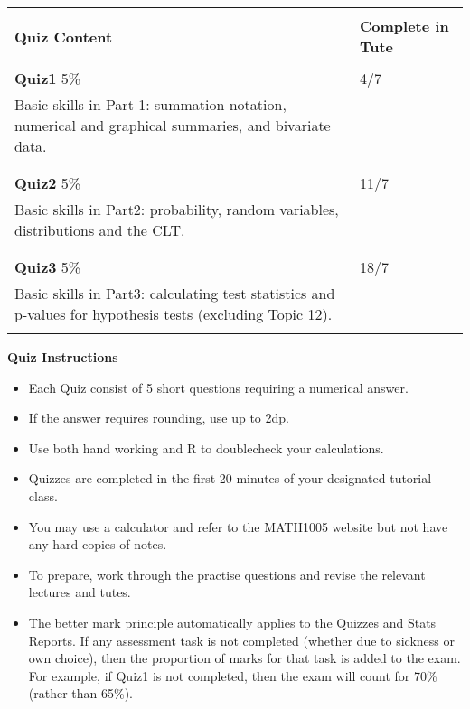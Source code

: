 \documentclass[bigtut]{quiz}\usepackage[]{graphicx}\usepackage[]{color}
\begin{document}
\begin{tutorial}
{\small \begin{tabular}{|l|l|} \hline  
& \\ 
 {\bf Quiz Content} \hspace{1cm} & {\bf Complete in Tute}  \\  [2ex]  \hline 
 & \\ 
 {\bf Quiz1}  5\%  &  4/7 \\
Basic skills in Part 1: summation notation, numerical and graphical  summaries, and bivariate data. &   \\
&    \\ [2ex]  \hline 
& \\ 
 {\bf Quiz2} 5\% &  11/7  \\
Basic skills in Part2: probability, random variables, distributions and the CLT. &   \\
  &  \\  [2ex]   \hline 
  & \\  
{\bf Quiz3} 5\% & 18/7 \\
Basic skills in Part3: calculating test statistics and p-values for hypothesis tests (excluding Topic 12). &    \\
    &   \\  [2ex]   \hline 
\end{tabular} }

\vspace{.5cm}
{\bf Quiz Instructions}
\begin{itemize}
\item Each Quiz consist of 5 short questions requiring a numerical answer. \\
\item If the answer requires rounding, use up to 2dp.  \\
\item Use both hand working and R to doublecheck your calculations. \\ 
\item Quizzes are completed in the first 20 minutes of your designated tutorial class.  \\ 
\item You may use a calculator and refer to the MATH1005 website but not have any hard copies of notes.  \\
\item To prepare, work through the practise questions and revise the relevant lectures and tutes. \\
\item The better mark principle automatically applies to the Quizzes and Stats Reports.  If any assessment task is not completed (whether due to sickness or own choice), then the proportion of marks for that task is added to the exam. For example, if Quiz1 is not completed, then the exam will count for 70\% (rather than 65\%).
\end{itemize}


\end{tutorial}
\end{document}
